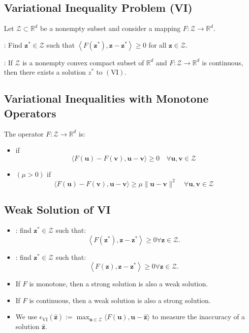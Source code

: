 \subsection*{Variational Inequality Problem (VI)}
Let $\mathcal{Z} \subset \mathbb{R}^{d}$ be a nonempty subset and consider a mapping $F: \mathcal{Z} \rightarrow \mathbb{R}^{d}$.

: Find $\mathbf{z}^{*} \in \mathcal{Z}$ such that $\left\langle F\left(\mathbf{z}^{*}\right), \mathbf{z}-\mathbf{z}^{*}\right\rangle \geq 0$ for all $\mathbf{z} \in \mathcal{Z}$.


: If $\mathcal{Z}$ is a nonempty convex compact subset of $\mathbb{R}^{d}$ and $F: \mathcal{Z} \rightarrow \mathbb{R}^{d}$ is continuous, then there exists a solution $z^{*}$ to $(\mathrm{VI})$.




\subsection*{Variational Inequalities with Monotone Operators}
The operator $F: \mathcal{Z} \rightarrow \mathbb{R}^{d}$ is:
\begin{itemize}[leftmargin=*]
    \item {} if
$$
\langle F(\mathbf{u})-F(\mathbf{v}), \mathbf{u}-\mathbf{v}\rangle \geq 0 \quad \forall \mathbf{u}, \mathbf{v} \in \mathcal{Z}
$$
    \item {} $(\mu>0)$ if
$$
\langle F(\mathbf{u})-F(\mathbf{v}), \mathbf{u}-\mathbf{v}\rangle \geq \mu\|\mathbf{u}-\mathbf{v}\|^{2} \quad \forall \mathbf{u}, \mathbf{v} \in \mathcal{Z}
$$
\end{itemize}






\subsection*{Weak Solution of VI}
\begin{itemize}[leftmargin=*]
    \item {}: find $\mathbf{z}^{*} \in \mathcal{Z}$ such that:
$$
\left\langle F\left(\mathbf{z}^{*}\right), \mathbf{z}-\mathbf{z}^{*}\right\rangle \geq 0 \forall \mathbf{z} \in \mathcal{Z} .
$$
    \item {}: find $\mathbf{z}^{*} \in \mathcal{Z}$ such that:
$$
\left\langle F(\mathbf{z}), \mathbf{z}-\mathbf{z}^{*}\right\rangle \geq 0 \forall \mathbf{z} \in \mathcal{Z} .
$$
    \item If $F$ is monotone, then a strong solution is also a weak solution.
    \item If $F$ is continuous, then a weak solution is also a strong solution.
    \item We use $\epsilon_{\mathrm{VI}}(\hat{\mathbf{z}}):=\max _{\mathbf{u} \in \mathcal{Z}}\langle F(\mathbf{u}), \mathbf{u}-\hat{\mathbf{z}}\rangle$ to measure the inaccuracy of a solution $\hat{\mathbf{z}}$.
\end{itemize}
